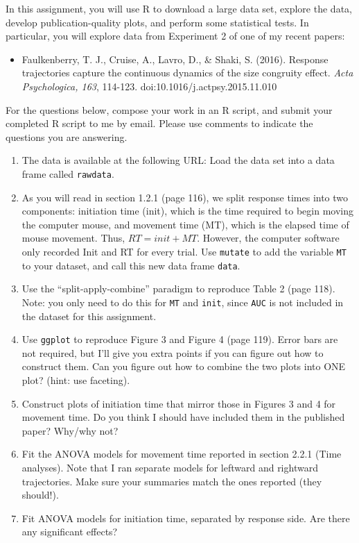 \documentclass[10pt]{article}
\begin{document}
\noindent
In this assignment, you will use R to download a large data set, explore the data, develop publication-quality plots, and perform some statistical tests.  In particular, you will explore data from Experiment 2 of one of my recent papers:

\begin{itemize}
\item Faulkenberry, T. J., Cruise, A., Lavro, D., \& Shaki, S. (2016). Response trajectories capture the continuous dynamics of the size congruity effect. {\it Acta Psychologica, 163}, 114-123. doi:10.1016/j.actpsy.2015.11.010
\end{itemize}

\noindent
For the questions below, compose your work in an R script, and submit your completed R script to me by email.  Please use comments to indicate the questions you are answering.

\begin{enumerate}
\item The data is available at the following URL:  Load the data set into a data frame called \verb|rawdata|.

\item As you will read in section 1.2.1 (page 116), we split response times into two components: initiation time (init), which is the time required to begin moving the computer mouse, and movement time (MT), which is the elapsed time of mouse movement.  Thus, $RT=init+MT$.  However, the computer software only recorded Init and RT for every trial.  Use \verb|mutate| to add the variable \verb|MT| to your dataset, and call this new data frame \verb|data|.

\item Use the ``split-apply-combine'' paradigm to reproduce Table 2 (page 118).  Note: you only need to do this for \verb|MT| and \verb|init|, since \verb|AUC| is not included in the dataset for this assignment.

\item Use \verb|ggplot| to reproduce Figure 3 and Figure 4 (page 119).  Error bars are not required, but I'll give you extra points if you can figure out how to construct them.  Can you figure out how to combine the two plots into ONE plot?  (hint: use faceting).

\item Construct plots of initiation time that mirror those in Figures 3 and 4 for movement time.  Do you think I should have included them in the published paper?  Why/why not?

\item Fit the ANOVA models for movement time reported in section 2.2.1 (Time analyses).  Note that I ran separate models for leftward and rightward trajectories.  Make sure your summaries match the ones reported (they should!).

\item Fit ANOVA models for initiation time, separated by response side.  Are there any significant effects?  

  
\end{enumerate}  
\end{document}
